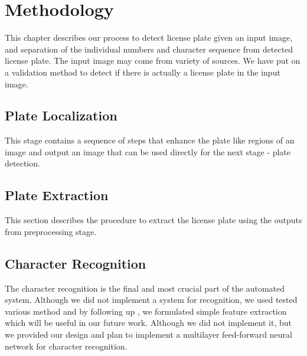\documentclass{standalone}
\begin{document}
\chapter{Methodology}
This chapter describes our process to detect license plate given an input image, and separation of the individual numbers and character sequence from detected license plate. The input image may come from variety of sources. We have put on a validation method to detect if there is actually a license plate in the input image.

  
  

\section{Plate Localization}
This stage contains a sequence of steps that enhance the plate like regions of an image and output an image that can be used directly for the next stage - plate detection.

  
  
  
  
  
  
  

\section{Plate Extraction}
This section describes the procedure to extract the license plate using the outputs from preprocessing stage. 
  
  
  
  
  




\section{Character Recognition}
The character recognition is the final and most crucial part of the automated system. Although we did not implement a system for recognition, we used tested various method and by following up \cite{joarder2012bangla}, we formulated simple feature extraction which will be useful in our future work. Although we did not implement it, but we provided our design and plan to implement a multilayer feed-forward neural network for character recognition.

  
  
\end{document}
